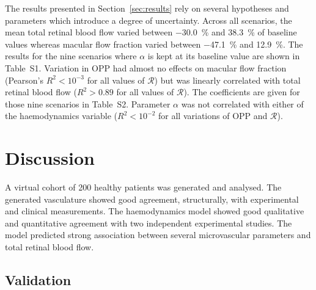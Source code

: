 \documentclass[11pt,]{article}
\begin{document}
The results presented in Section~\ref{sec:results} rely on several hypotheses and parameters which introduce a degree of uncertainty.
Across all scenarios, the mean total retinal blood flow varied between \SI{-30.0}{\percent} and \SI{38.3}{\percent} of baseline values whereas macular flow fraction varied between \SI{-47.1}{\percent} and \SI{12.9}{\percent}.
The results for the nine scenarios where $\alpha$ is kept at its baseline value are shown in Table~S1.
Variation in OPP had almost no effects on macular flow fraction (Pearson's ${R^2<10^{-3}}$ for all values of $\mathcal R$) but was linearly correlated with total retinal blood flow (${R^2>0.89}$ for all values of $\mathcal R$).
The coefficients are given for those nine scenarios in Table~S2.
Parameter $\alpha$ was not correlated with either of the haemodynamics variable (${R^2<10^{-2}}$ for all variations of OPP and $\mathcal R$). 

\section{Discussion}\label{sec:discussion}

A virtual cohort of 200 healthy patients was generated and analysed. 
The generated vasculature showed good agreement, structurally, with experimental and clinical measurements.
The haemodynamics model showed good qualitative and quantitative agreement with two independent experimental studies.
The model predicted strong association between several microvascular parameters and total retinal blood flow.

\subsection{Validation}\label{sec:disc-validation}
\end{document}
